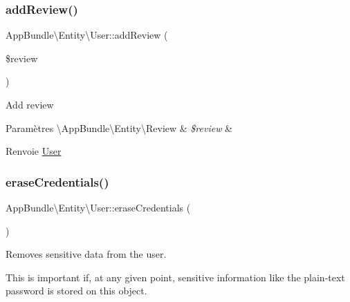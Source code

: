 \subsubsection{\texorpdfstring{add\+Review()}{addReview()}}
{\footnotesize\ttfamily App\+Bundle\textbackslash{}\+Entity\textbackslash{}\+User\+::add\+Review (\begin{DoxyParamCaption}\item[{\textbackslash{}\hyperlink{classAppBundle_1_1Entity_1_1Review}{App\+Bundle\textbackslash{}\+Entity\textbackslash{}\+Review}}]{\$review }\end{DoxyParamCaption})}

Add review


\begin{DoxyParams}[1]{Paramètres}
\textbackslash{}\+App\+Bundle\textbackslash{}\+Entity\textbackslash{}\+Review & {\em \$review} & \\
\hline
\end{DoxyParams}
\begin{DoxyReturn}{Renvoie}
\hyperlink{classAppBundle_1_1Entity_1_1User}{User} 
\end{DoxyReturn}
\mbox{\label{classAppBundle_1_1Entity_1_1User_adc1ae82385690849964ace63e84a1321}} 
\subsubsection{\texorpdfstring{erase\+Credentials()}{eraseCredentials()}}
{\footnotesize\ttfamily App\+Bundle\textbackslash{}\+Entity\textbackslash{}\+User\+::erase\+Credentials (\begin{DoxyParamCaption}{ }\end{DoxyParamCaption})}

Removes sensitive data from the user.

This is important if, at any given point, sensitive information like the plain-\/text password is stored on this object. \mbox{\label{classAppBundle_1_1Entity_1_1User_a770921ad3fbe7019a53d0dd7a3ec1328}} 
